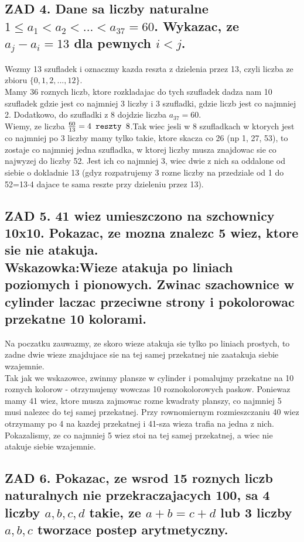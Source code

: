 \documentclass{article}
\begin{document}
\subsection*{\color{tit}ZAD 4. Dane sa liczby naturalne $1\leq a_1<a_2<...<a_{37}=60$. Wykazac, ze $a_j-a_i=13$ dla pewnych $i<j$.}
  Wezmy 13 szufladek i oznaczmy kazda reszta z dzielenia przez 13, czyli liczba ze zbioru $\{0, 1, 2,..., 12\}$. \\
  Mamy 36 roznych liczb, ktore rozkladajac do tych szufladek dadza nam 10 szufladek gdzie jest co najmniej 3 liczby i 3 szufladki, gdzie liczb jest co najmniej 2. Dodatkowo, do szufladki z 8 dojdzie liczba $a_{37}=60$.\\
  Wiemy, ze liczba ${60\over13}=4\texttt{ reszty }8$.Tak wiec jesli w 8 szufladkach w ktorych jest co najmniej po 3 liczby mamy tylko takie, ktore skacza co 26 (np 1, 27, 53), to zostaje co najmniej jedna szufladka, w ktorej liczby musza znajdowac sie co najwyzej do liczby 52. Jest ich co najmniej 3, wiec dwie z nich sa oddalone od siebie o dokladnie 13 (gdyz rozpatrujemy 3 rozne liczby na przedziale od 1 do 52=13$\cdot$4 dajace te sama reszte przy dzieleniu przez 13).
\subsection*{\color{tit}ZAD 5. 41 wiez umieszczono na szchownicy 10x10. Pokazac, ze mozna znalezc 5 wiez, ktore sie nie atakuja.\\Wskazowka:Wieze atakuja po liniach poziomych i pionowych. Zwinac szachownice w cylinder laczac przeciwne strony i pokolorowac przekatne 10 kolorami.}
  Na poczatku zauwazmy, ze skoro wieze atakuja sie tylko po liniach prostych, to zadne dwie wieze znajdujace sie na tej samej przekatnej nie zaatakuja siebie wzajemnie.\\
  Tak jak we wskazowce, zwinmy plansze w cylinder i pomalujmy przekatne na 10 roznych kolorow - otrzymujemy wowczas 10 roznokolorowych paskow. Poniewaz mamy 41 wiez, ktore musza zajmowac rozne kwadraty planszy, co najmniej 5 musi nalezec do tej samej przekatnej. Przy rownomiernym rozmieszczaniu 40 wiez otrzymamy po 4 na kazdej przekatnej i 41-sza wieza trafia na jedna z nich.\\
  Pokazalismy, ze co najmniej 5 wiez stoi na tej samej przekatnej, a wiec nie atakuje siebie wzajemnie.
\subsection*{\color{tit}ZAD 6. Pokazac, ze wsrod 15 roznych liczb naturalnych nie przekraczajacych 100, sa 4 liczby $a, b, c, d$ takie, ze $a+b=c+d$ lub 3 liczby $a, b, c$ tworzace postep arytmetyczny.}
\end{document}
